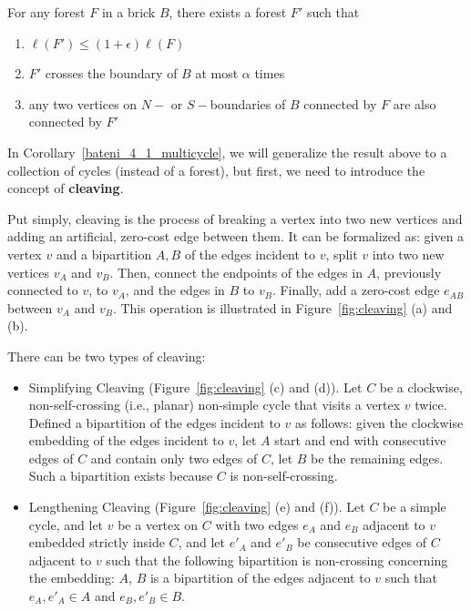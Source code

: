 \begin{lemma}  \label{bateni_4_1_forest}
    For any forest \(F\) in a brick \(B\), there exists a forest \(F'\) such that
\begin{enumerate}
    \item \(\ell(F') \leq (1 + \epsilon)\ell(F)\)
    \item \(F'\) crosses the boundary of \(B\) at most \(\alpha\) times
    \item any two vertices on \(N-\) or \(S-\)boundaries of \(B\) connected by \(F\) are also connected by \(F'\)
\end{enumerate}
\end{lemma}

In Corollary~\ref{bateni_4_1_multicycle}, we will generalize the result above to a collection of cycles (instead of a forest), but first, we need to introduce the concept of \textbf{cleaving}.

Put simply, cleaving is the process of breaking a vertex into two new vertices and adding an artificial, zero-cost edge between them. It can be formalized as: given a vertex \(v\) and a bipartition \(A, B\) of the edges incident to \(v\), split \(v\) into two new vertices \(v_A\) and \(v_B\). Then, connect the endpoints of the edges in \(A\), previously connected to \(v\), to \(v_A\), and the edges in \(B\) to \(v_B\). Finally, add a zero-cost edge \(e_{AB}\) between \(v_A\) and \(v_B\). This operation is illustrated in Figure~\ref{fig:cleaving} (a) and (b).

There can be two types of cleaving:
\begin{itemize}
    \item Simplifying Cleaving (Figure~\ref{fig:cleaving} (c) and (d)). Let \(C\) be a clockwise, non-self-crossing (i.e., planar) non-simple cycle that visits a vertex \(v\) twice. Defined a bipartition of the edges incident to \(v\) as follows: given the clockwise embedding of the edges incident to \(v\), let \(A\) start and end with consecutive edges of \(C\) and contain only two edges of \(C\), let \(B\) be the remaining edges. Such a bipartition exists because \(C\) is non-self-crossing.
    \item Lengthening Cleaving (Figure~\ref{fig:cleaving} (e) and (f)). Let \(C\) be a simple cycle, and let \(v\) be a vertex on \(C\) with two edges \(e_A\) and \(e_B\) adjacent to \(v\) embedded strictly inside \(C\), and let \(e'_A\) and \(e'_B\) be consecutive edges of \(C\) adjacent to \(v\) such that the following bipartition is non-crossing concerning the embedding: \(A\), \(B\) is a bipartition of the edges adjacent to \(v\) such that \(e_A, e'_A \in A\) and \(e_B, e'_B \in B\).
\end{itemize}

